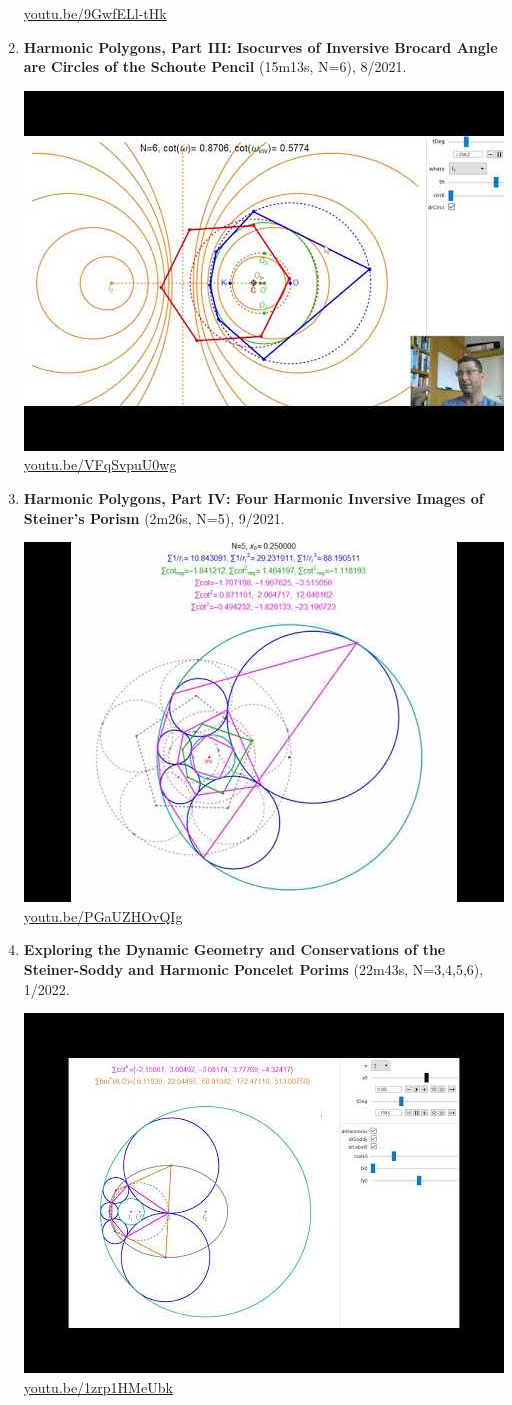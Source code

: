 \documentclass[12pt]{amsart}
\begin{document}
\begin{enumerate}[resume]
\begin{center}
\href{https://youtu.be/9GwfELl-tHk}{\url{youtu.be/9GwfELl-tHk}}\end{center}
% 
\item \textbf{Harmonic Polygons, Part III: Isocurves of Inversive Brocard Angle are Circles of the Schoute Pencil} (15m13s, N=6), 8/2021. 
\begin{center}\includegraphics[width=.5\textwidth]{pics/VFqSvpuU0wg.jpg} \\ 
\href{https://youtu.be/VFqSvpuU0wg}{\url{youtu.be/VFqSvpuU0wg}}\end{center}
% 
\item \textbf{Harmonic Polygons, Part IV: Four Harmonic Inversive Images of Steiner's Porism} (2m26s, N=5), 9/2021. 
\begin{center}\includegraphics[width=.5\textwidth]{pics/PGaUZHOvQIg.jpg} \\ 
\href{https://youtu.be/PGaUZHOvQIg}{\url{youtu.be/PGaUZHOvQIg}}\end{center}
% 
\item \textbf{Exploring the Dynamic Geometry and Conservations of the Steiner-Soddy and Harmonic Poncelet Porims} (22m43s, N=3,4,5,6), 1/2022. 
\begin{center}\includegraphics[width=.5\textwidth]{pics/1zrp1HMeUbk.jpg} \\ 
\href{https://youtu.be/1zrp1HMeUbk}{\url{youtu.be/1zrp1HMeUbk}}\end{center}
% 
\end{enumerate}
\end{document}

